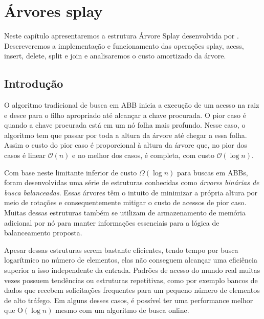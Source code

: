 
\chapter{Árvores splay}
\label{cap:arvores-splay}

Neste capítulo apresentaremos a estrutura Árvore Splay desenvolvida por \cite{selfadjustingbst}. Descreveremos a implementação e funcionamento das operações splay, acess, insert, delete, split e join e analisaremos o custo amortizado da árvore.


\section{Introdução}
O algoritmo tradicional de busca em ABB inicia a execução de um acesso na raiz e desce para o filho apropriado até alcançar a chave procurada. O pior caso é quando a chave procurada está em um nó folha mais profundo. Nesse caso, o algoritmo tem que passar por toda a altura da árvore até chegar a essa folha. Assim o custo do pior caso é proporcional à altura da árvore que, no pior dos casos é linear $\mathcal{O}(n)$ e no melhor dos casos, é completa, com custo $\mathcal{O}(\log{}n)$.

Com base neste limitante inferior de custo $\Omega(\log{}n)$ para buscas em ABBs, foram desenvolvidas uma série de estruturas conhecidas como \textit{árvores binárias de busca balanceadas}. Essas árvores têm o intuito de minimizar a própria altura por meio de rotações e consequentemente mitigar o custo de acessos de pior caso. Muitas dessas estruturas também se utilizam de armazenamento de memória adicional por nó para manter informações essenciais para a lógica de balanceamento proposta. 

Apesar dessas estruturas serem bastante eficientes, tendo tempo por busca logarítmico no número de elementos, elas não conseguem alcançar uma eficiência superior a isso independente da entrada. Padrões de acesso do mundo real muitas vezes possuem tendências ou estruturas repetitivas, como por exemplo bancos de dados que recebem solicitações frequentes para um pequeno número de elementos de alto tráfego. Em alguns desses casos, é possível ter uma performance melhor que O$(\log{}n)$ mesmo com um algoritmo de busca online.

